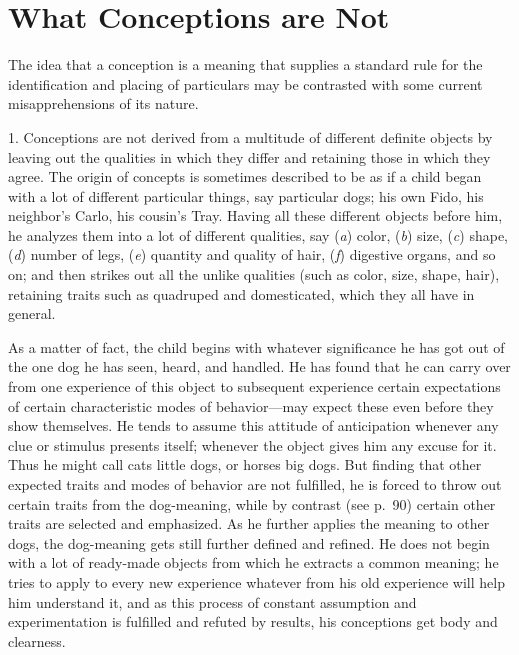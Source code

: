 \documentclass[showtrims,ustradepaper]{memoir}
\begin{document}
\section*{What Conceptions are Not}

The idea that a conception is a meaning that supplies a standard rule
for the identification and placing of particulars may be contrasted with
some current misapprehensions of its nature.


1. Conceptions are not derived from a multitude
of
different definite objects by leaving out the qualities in which they
differ and retaining those in which they agree. The origin of concepts
is sometimes described to be as if a child began with a lot of different
particular things, say particular dogs; his own Fido, his neighbor's
Carlo, his cousin's Tray. Having all these different objects before him,
he analyzes them into a lot of different qualities, say (\emph{a})
color, (\emph{b}) size, (\emph{c}) shape, (\emph{d}) number of legs,
(\emph{e}) quantity and quality of hair, (\emph{f}) digestive organs,
and so on; and then strikes out all the unlike qualities (such as color,
size, shape, hair), retaining traits such as quadruped and domesticated,
which they all have in general.


As a matter of fact, the child begins with whatever significance he has
got out of the one dog he has seen, heard, and handled. He has found
that he can carry over from one experience of this object to subsequent
experience certain expectations of certain characteristic modes of
behavior---may expect these even before they show themselves. He tends
to assume this attitude of anticipation whenever any clue or stimulus
presents itself; whenever the object gives him any excuse for it. Thus
he might call cats little dogs, or horses big dogs. But finding that
other expected traits and modes of behavior are not fulfilled, he is
forced to throw out certain traits from the dog-meaning, while by
contrast (see p.\ 90) certain other traits are selected and emphasized.
As he further applies the meaning to other dogs, the dog-meaning gets
still further defined and refined. He does not begin with a lot of
ready-made objects from which he extracts a common meaning; he tries to
apply to every new experience whatever from his old experience will help
him understand
it,
and as this process of constant assumption and experimentation is
fulfilled and refuted by results, his conceptions get body and
clearness.
\end{document}
